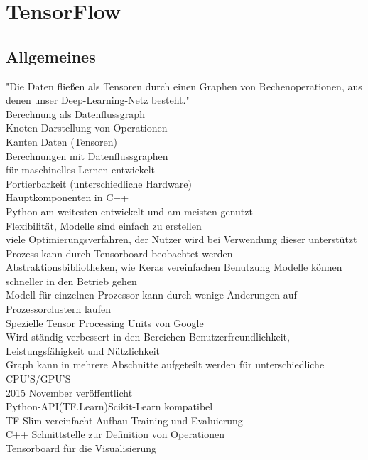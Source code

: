\chapter{TensorFlow}
\label{chap:tensorflow}
\chapterauthor{\authorNiklas}

\section{Allgemeines}
\label{sec:allgemeines}
"Die Daten fließen als Tensoren durch einen Graphen von Rechenoperationen, aus denen unser Deep-Learning-Netz besteht." \citep{Einfuehrung}\\
Berechnung als Datenflussgraph\\
Knoten Darstellung von Operationen\\
Kanten Daten (Tensoren)\\
Berechnungen mit Datenflussgraphen\\
für maschinelles Lernen entwickelt\\
Portierbarkeit (unterschiedliche Hardware)\\
Hauptkomponenten in C++\\
Python am weitesten entwickelt und am meisten genutzt\\
Flexibilität, Modelle sind einfach zu erstellen\\
viele Optimierungsverfahren, der Nutzer wird bei Verwendung dieser unterstützt\\
Prozess kann durch Tensorboard beobachtet werden\\
Abstraktionsbibliotheken, wie Keras vereinfachen Benutzung
Modelle können schneller in den Betrieb gehen\\
Modell für einzelnen Prozessor kann durch wenige Änderungen
auf Prozessorclustern laufen\\
Spezielle Tensor Processing Units von Google\\
Wird ständig verbessert in den Bereichen Benutzerfreundlichkeit, Leistungsfähigkeit und Nützlichkeit\\
Graph kann in mehrere Abschnitte aufgeteilt werden für unterschiedliche CPU'S/GPU'S\\
2015 November veröffentlicht\\
Python-API(TF.Learn)Scikit-Learn kompatibel\\
TF-Slim vereinfacht Aufbau Training und Evaluierung\\
C++ Schnittstelle zur Definition von Operationen\\
Tensorboard für die Visualisierung\\


